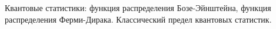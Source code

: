 \documentclass[__main__.tex]{subfiles}
\begin{document}
Квантовые статистики: функция распределения Бозе-Эйнштейна, функция распределения Ферми-Дирака. Классический предел квантовых статистик.\\ 

\end{document}
